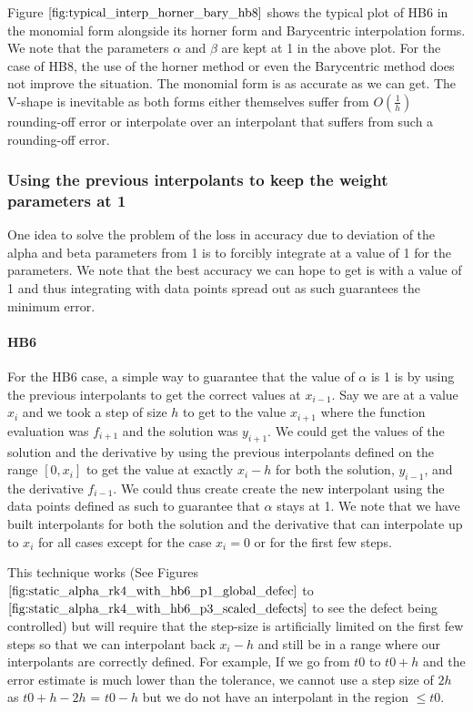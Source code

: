 \documentclass{article}
\begin{document}
Figure $\ref{fig:typical_interp_horner_bary_hb8}$ shows the typical plot of HB6 in the monomial form alongside its horner form and Barycentric interpolation forms. We note that the parameters $\alpha$ and $\beta$ are kept at 1 in the above plot. For the case of HB8, the use of the horner method or even the Barycentric method does not improve the situation. The monomial form is as accurate as we can get. The V-shape is inevitable as both forms either themselves suffer from $O(\frac{1}{h})$ rounding-off error or interpolate over an interpolant that suffers from such a rounding-off error.

\subsubsection{Using the previous interpolants to keep the weight parameters at 1}
\label{section:keeping_alpha_at_1}
One idea to solve the problem of the loss in accuracy due to deviation of the alpha and beta parameters from 1 is to forcibly integrate at a value of 1 for the parameters. We note that the best accuracy we can hope to get is with a value of 1 and thus integrating with data points spread out as such guarantees the minimum error.

\paragraph{HB6} For the HB6 case, a simple way to guarantee that the value of $\alpha$ is 1 is by using the previous interpolants to get the correct values at $x_{i - 1}$. Say we are at a value $x_i$ and we took a step of size $h$ to get to the value $x_{i + 1}$ where the function evaluation was $f_{i + 1}$ and the solution was $y_{i + 1}$. We could get the values of the solution and the derivative by using the previous interpolants defined on the range $[0, x_i]$ to get the value at exactly $x_i - h$ for both the solution, $y_{i - 1}$, and the derivative $f_{i - 1}$.  We could thus create create the new interpolant using the data points defined as such to guarantee that $\alpha$ stays at 1. We note that we have built interpolants for both the solution and the derivative that  can interpolate up to $x_i$ for all cases except for the case $x_i = 0$ or for the first few steps.

This technique works (See Figures $\ref{fig:static_alpha_rk4_with_hb6_p1_global_defec}$ to $\ref{fig:static_alpha_rk4_with_hb6_p3_scaled_defects}$ to see the defect being controlled) but will require that the step-size is artificially limited on the first few steps so that we can interpolant back $x_i - h$ and still be in a range where our interpolants are correctly defined. For example, If we go from $t0$ to $t0 + h$ and the error estimate is much lower than the tolerance, we cannot use a step size of $2h$ as $t0 + h - 2h$ = $t0-h$ but we do not have an interpolant in the region $\leq t0$.
\end{document}
